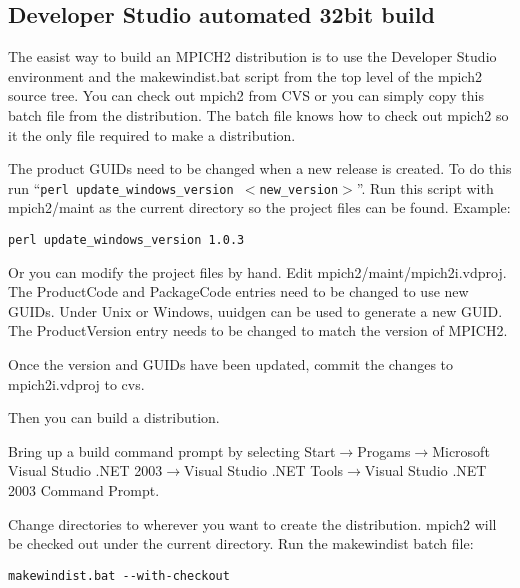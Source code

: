 \documentclass[dvipdfm,11pt]{article}
\begin{document}
\subsection{Developer Studio automated 32bit build}
\label{sec:devstudiobuild}

The easist way to build an MPICH2 distribution is to use the Developer Studio environment
and the makewindist.bat script from the top level of the mpich2 source tree.  You can check
out mpich2 from CVS or you can simply copy this batch file from the distribution.  The batch
file knows how to check out mpich2 so it the only file required to make a distribution.

The product GUIDs need to be changed when a new release is created.  To do this run 
``\texttt{perl update\_windows\_version $<$new\_version$>$}''.  Run this script with mpich2/maint 
as the current directory so the project files can be found.  Example:
\begin{verbatim}
perl update_windows_version 1.0.3
\end{verbatim}

Or you can modify the project files by hand.  Edit mpich2/maint/mpich2i.vdproj.  The ProductCode
and PackageCode entries need to be changed to use new GUIDs.  Under Unix or Windows, uuidgen can 
be used to generate a new GUID.  The ProductVersion entry needs to be changed to match the 
version of MPICH2.

Once the version and GUIDs have been updated, commit the changes to mpich2i.vdproj to cvs.

Then you can build a distribution.

Bring up a build command prompt by selecting Start$\to$Progams$\to$Microsoft Visual Studio 
.NET 2003$\to$Visual Studio .NET Tools$\to$Visual Studio .NET 2003 Command Prompt.

Change directories to wherever you want to create the distribution.  mpich2 will be checked 
out under the current directory.  Run the makewindist batch file:

\begin{verbatim}
makewindist.bat --with-checkout
\end{verbatim}
\end{document}
